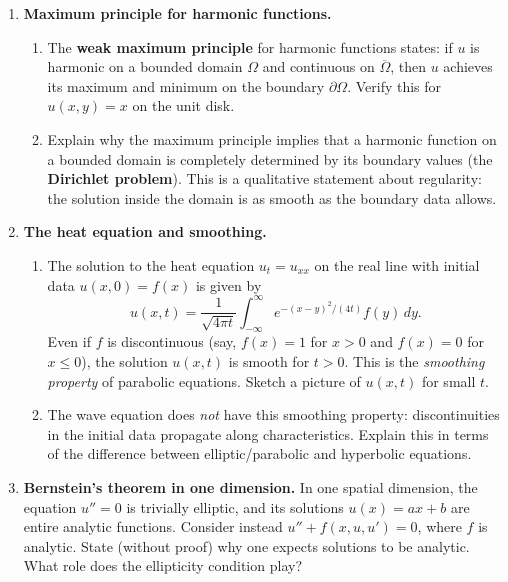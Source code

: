 \begin{enumerate}
    \item \textbf{Maximum principle for harmonic functions.}
    \begin{enumerate}
        \item The \textbf{weak maximum principle} for harmonic functions states: if $u$ is harmonic on a bounded domain $\Omega$ and continuous on $\overline{\Omega}$, then $u$ achieves its maximum and minimum on the boundary $\partial \Omega$. Verify this for $u(x,y) = x$ on the unit disk.
        \item Explain why the maximum principle implies that a harmonic function on a bounded domain is completely determined by its boundary values (the \textbf{Dirichlet problem}). This is a qualitative statement about regularity: the solution inside the domain is as smooth as the boundary data allows.
    \end{enumerate}

    \item \textbf{The heat equation and smoothing.}
    \begin{enumerate}
        \item The solution to the heat equation $u_t = u_{xx}$ on the real line with initial data $u(x, 0) = f(x)$ is given by
        \[
            u(x, t) = \frac{1}{\sqrt{4\pi t}} \int_{-\infty}^{\infty} e^{-(x-y)^2 / (4t)} f(y) \, dy.
        \]
        Even if $f$ is discontinuous (say, $f(x) = 1$ for $x > 0$ and $f(x) = 0$ for $x \leq 0$), the solution $u(x,t)$ is smooth for $t > 0$. This is the \emph{smoothing property} of parabolic equations. Sketch a picture of $u(x,t)$ for small $t$.
        \item The wave equation does \emph{not} have this smoothing property: discontinuities in the initial data propagate along characteristics. Explain this in terms of the difference between elliptic/parabolic and hyperbolic equations.
    \end{enumerate}

    \item[$\star$] \textbf{Bernstein's theorem in one dimension.} In one spatial dimension, the equation $u'' = 0$ is trivially elliptic, and its solutions $u(x) = ax + b$ are entire analytic functions. Consider instead $u'' + f(x, u, u') = 0$, where $f$ is analytic. State (without proof) why one expects solutions to be analytic. What role does the ellipticity condition play?


\end{enumerate}
